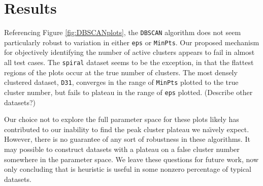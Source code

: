 \documentclass[12pt]{article}
\begin{document}
\section{Results}
\par Referencing Figure \ref{fig:DBSCANplots}, the \texttt{DBSCAN} algorithm does not seem particularly robust to variation in either \texttt{eps} or \texttt{MinPts}. Our proposed mechanism for objectively identifying the number of active clusters appears to fail in almost all test cases. The \texttt{spiral} dataset seems to be the exception, in that the flattest regions of the plots occur at the true number of clusters. The most densely clustered dataset, \texttt{D31}, converges in the range of \texttt{MinPts} plotted to the true cluster number, but fails to plateau in the range of \texttt{eps} plotted. (Describe other datasets?)
\par Our choice not to explore the full parameter space for these plots likely has contributed to our inability to find the peak cluster plateau we na\"\i vely expect. However, there is no guarantee of any sort of robustness in these algorithms. It may possible to construct datasets with a plateau on a false cluster number somewhere in the parameter space. We leave these questions for future work, now only concluding that is heuristic is useful in some nonzero percentage of typical datasets.
\clearpage


\end{document}
